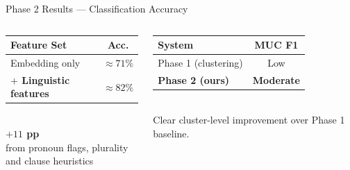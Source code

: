 \documentclass[aspectratio=169]{beamer}
\begin{document}
\begin{frame}{Phase 2 Results — Classification Accuracy}
\begin{columns}[T]
      \begin{tcolorbox}[rbox={Ablation Study}]
        \small\centering
        \renewcommand{\arraystretch}{1.4}
        \begin{tabular}{lc}
          \toprule
          \textbf{Feature Set} & \textbf{Acc.}\\
          \midrule
          Embedding only & ${\approx}71\%$\\
          \textbf{$+$ Linguistic features} & \textbf{${\approx}82\%$}\\
          \bottomrule
        \end{tabular}\\[6pt]
        \textcolor{accentgreen}{\Large\textbf{$+11$ pp}}\\[2pt]
        \small from pronoun flags, plurality\\
        and clause heuristics
      \end{tcolorbox}

      \vspace{6pt}
      \begin{tcolorbox}[nbox={MUC Coreference Evaluation}]
        \small
        \renewcommand{\arraystretch}{1.35}
        \begin{tabular}{lc}
          \toprule
          \textbf{System} & \textbf{MUC F1}\\
          \midrule
          Phase 1 (clustering) & Low\\
          \textbf{Phase 2 (ours)} & \textbf{Moderate}\\
          \bottomrule
        \end{tabular}\\[4pt]
        Clear cluster-level improvement
        over Phase 1 baseline.
      \end{tcolorbox}
  \end{columns}
\end{frame}
\end{document}
